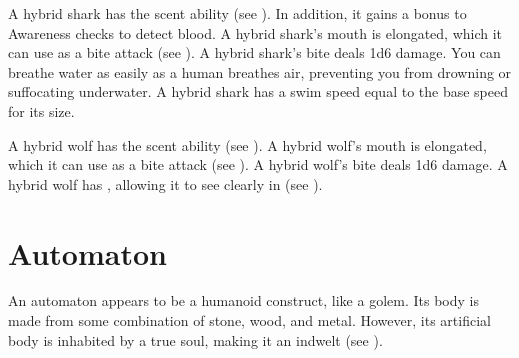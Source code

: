 
        \begin{itemize}
             A hybrid shark has the scent ability (see ).
                In addition, it gains a  bonus to Awareness checks to detect blood.
             A hybrid shark's mouth is elongated, which it can use as a bite attack (see ).
                A hybrid shark's bite deals 1d6 damage.
             You can breathe water as easily as a human breathes air, preventing you from drowning or suffocating underwater.
             A hybrid shark has a swim speed equal to the base speed for its size.
        \end{itemize}


        \begin{itemize}
             A hybrid wolf has the scent ability (see ).
             A hybrid wolf's mouth is elongated, which it can use as a bite attack (see ).
                A hybrid wolf's bite deals 1d6 damage.
             A hybrid wolf has , allowing it to see clearly in  (see ).
        \end{itemize}

\section{Automaton}
    An automaton appears to be a humanoid construct, like a golem.
    Its body is made from some combination of stone, wood, and metal.
    However, its artificial body is inhabited by a true soul, making it an indwelt (see ).

